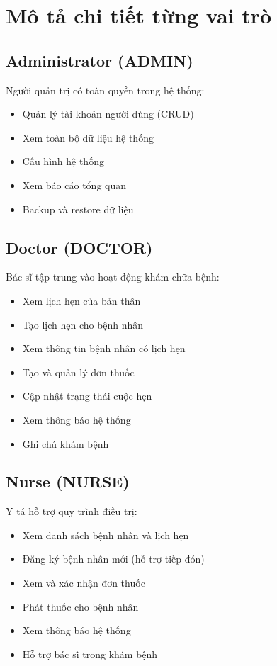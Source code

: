 \documentclass[12pt,a4paper]{report}
\begin{document}
    \section{Mô tả chi tiết từng vai trò}

    \subsection{Administrator (ADMIN)}
    Người quản trị có toàn quyền trong hệ thống:
    \begin{itemize}
        \item Quản lý tài khoản người dùng (CRUD)
        \item Xem toàn bộ dữ liệu hệ thống
        \item Cấu hình hệ thống
        \item Xem báo cáo tổng quan
        \item Backup và restore dữ liệu
    \end{itemize}

    \subsection{Doctor (DOCTOR)}
    Bác sĩ tập trung vào hoạt động khám chữa bệnh:
    \begin{itemize}
        \item Xem lịch hẹn của bản thân
        \item Tạo lịch hẹn cho bệnh nhân
        \item Xem thông tin bệnh nhân có lịch hẹn
        \item Tạo và quản lý đơn thuốc
        \item Cập nhật trạng thái cuộc hẹn
        \item Xem thông báo hệ thống
        \item Ghi chú khám bệnh
    \end{itemize}

    \subsection{Nurse (NURSE)}
    Y tá hỗ trợ quy trình điều trị:
    \begin{itemize}
        \item Xem danh sách bệnh nhân và lịch hẹn
        \item Đăng ký bệnh nhân mới (hỗ trợ tiếp đón)
        \item Xem và xác nhận đơn thuốc
        \item Phát thuốc cho bệnh nhân
        \item Xem thông báo hệ thống
        \item Hỗ trợ bác sĩ trong khám bệnh
    \end{itemize}
\end{document}
